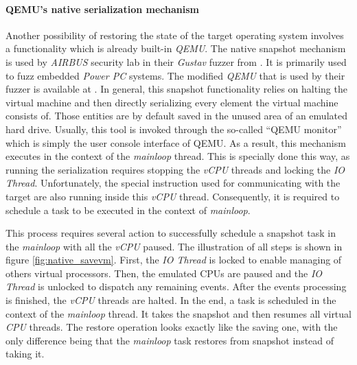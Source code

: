 \paragraph{QEMU's native serialization mechanism} \label{sec:qemu_nat}
Another possibility of restoring the state of the target operating system involves a functionality which is already built-in \textit{QEMU}. The native snapshot mechanism is used by \textit{AIRBUS} security lab in their \textit{Gustav} fuzzer from \cite{gustavdoc}. It is primarily used to fuzz embedded \textit{Power PC} systems. The modified \textit{QEMU} that is used by their fuzzer is available at \cite{airbusqemu}. In general, this snapshot functionality relies on halting the virtual machine and then directly serializing every element the virtual machine consists of. Those entities are by default saved in the unused area of an emulated hard drive. Usually, this tool is invoked through the so-called “QEMU monitor” which is simply the user console interface of QEMU. As a result, this mechanism executes in the context of the \textit{mainloop} thread. This is specially done this way, as running the serialization requires stopping the \textit{vCPU} threads and locking the \textit{IO Thread}. Unfortunately, the special instruction used for communicating with the target are also running inside this \textit{vCPU} thread. Consequently, it is required to schedule a task to be executed in the context of \textit{mainloop}.

This process requires several action to successfully schedule a snapshot task in the \textit{mainloop} with all the \textit{vCPU} paused. The illustration of all steps is shown in figure \ref{fig:native_savevm}. First, the \textit{IO Thread} is locked to enable managing of others virtual processors. Then, the emulated CPUs are paused and the \textit{IO Thread} is unlocked to dispatch any remaining events. After the events processing is finished, the \textit{vCPU} threads are halted. In the end, a task is scheduled in the context of the \textit{mainloop} thread. It takes the snapshot and then resumes all virtual \textit{CPU} threads. The restore operation looks exactly like the saving one, with the only difference being that the \textit{mainloop} task restores from snapshot instead of taking it.

